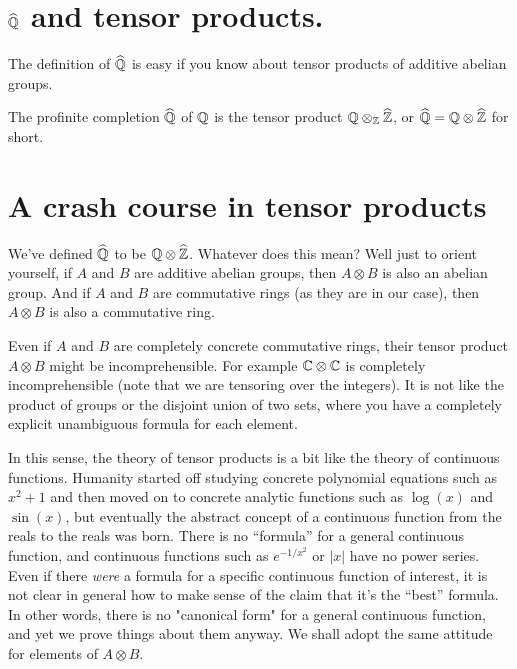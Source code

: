\section{$\widehat{\mathbb{Q}}$ and tensor products.}

The definition of $\widehat{\mathbb{Q}}$ is easy if you know about tensor products
of additive abelian groups.

\begin{definition}
    \label{QHat}
    \leanok
    The profinite completion $\widehat{\mathbb{Q}}$ of $\mathbb{Q}$ is the tensor product $\mathbb{Q}\otimes_{\mathbb{Z}}\widehat{\mathbb{Z}}$,
    or $\widehat{\mathbb{Q}}=\mathbb{Q}\otimes\widehat{\mathbb{Z}}$ for short.
\end{definition}

\section{A crash course in tensor products}

We've defined $\widehat{\mathbb{Q}}$ to be $\mathbb{Q}\otimes\widehat{\mathbb{Z}}$. Whatever does this mean? Well just to orient yourself,
if $A$ and $B$ are additive abelian groups, then $A\otimes B$ is also an abelian group. 
And if $A$ and $B$ are commutative rings (as they are in our case), then $A\otimes B$ is also
a commutative ring. 

Even if $A$ and $B$ are completely concrete commutative rings, their tensor product $A\otimes B$
might be incomprehensible. For example $\mathbb{C}\otimes\mathbb{C}$ is completely incomprehensible (note that we are
tensoring over the integers). It is not like the product of groups or the disjoint union of
two sets, where you have a completely explicit unambiguous formula for each element. 

In this sense, the theory of tensor products is a bit like the theory of continuous functions. 
Humanity started off studying concrete polynomial equations such as $x^2+1$ and then moved on to 
concrete analytic functions such as $\log(x)$ and $\sin(x)$, but eventually the abstract concept 
of a continuous function from the reals to the reals was born. There is no ``formula'' for a general 
continuous function, and continuous functions such as $e^{-1/x^2}$ or $|x|$ have no power series.
Even if there \emph{were} a formula for a specific continuous function of interest, it is not clear 
in general how to make sense of the claim that it's the ``best'' formula. In other words, there is 
no "canonical form" for a general continuous function, and yet we prove things about them anyway. 
We shall adopt the same attitude for elements of $A\otimes B$.

